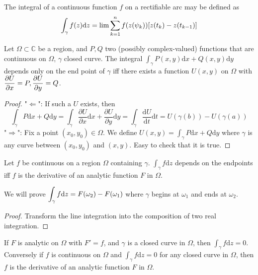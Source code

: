 The integral of a continuous function  $ f $ on a rectifiable arc may be defined as 
\[\displaystyle\int_\gamma f(z)\mathrm{d}z=\lim \sum_{k=1}^nf(z(\psi_k))[z(t_k)-z(t_{k-1})]\] 
\begin{theorem}\label{thm:5.1.2:integral conserved iff it is a derivative of an analytic function}
    Let  $ \Omega\subset \mathbb{C} $ be a region, and  $ P,Q $ two (possibly complex-valued) functions that are continuous on  $ \Omega $,  $ \gamma $ closed curve. The integral  $ \int_\gamma P(x,y)\mathrm{d}x+Q(x,y)\mathrm{d}y $ depends only on the end point of  $ \gamma $ iff there exists a function   $ U(x,y) $ on  $ \Omega $ with  $ \displaystyle\frac{\partial U}{\partial x}=P,\frac{\partial U}{\partial y}=Q $.  
\end{theorem}
\begin{proof}
    "$ \Leftarrow $": If such a  $ U $ exists, then 
    \[\int_\gamma P\mathrm{d}x+Q\mathrm{d}y=\int_\gamma\frac{\partial U}{\partial x}\mathrm{d}x+\frac{\partial U}{\partial y}\mathrm{d}y=\int_\gamma\frac{\mathrm{d}U}{\mathrm{d}t}\mathrm{d}t=U(\gamma(b))-U(\gamma(a))\] 
    "$ \Rightarrow $": Fix a point  $ (x_0,y_0)\in \Omega $. We define  $ U(x,y)=\int_\gamma P\mathrm{d}x+Q\mathrm{d}y$ where  $ \gamma $ is any curve between  $ (x_0,y_0) $ and  $ (x,y) $. Easy to check that it is true.     
\end{proof}
\begin{theorem}\label{Fundamental theorem of Calculus for integrals}
    Let  $ f $ be continuous on a region  $ \Omega $  containing  $ \gamma $.  $ \int_\gamma f\mathrm{d}z $ depends on the endpoints iff  $ f $ is the derivative of an analytic function  $ F $ in  $ \Omega $.     
\end{theorem}
\begin{remark}
    We will prove  $ \displaystyle\int_\gamma f\mathrm{d}z=F(\omega_2)-F(\omega_1) $ where  $ \gamma $ begins at  $ \omega_1 $ and ends at  $ \omega_2 $.    
\end{remark}
\begin{proof}
    Transform  the line integration into  the composition of two real integration.
\end{proof}
\begin{corollary}\label{Corollary of Fundamental Theorem}
    If  $ F $ is analytic on  $ \Omega $ with  $ F'=f $, and  $ \gamma $ is a closed curve in  $\Omega $, then  $ \int_\gamma f\mathrm{d}z=0 $. Conversely if  $ f $  is continuous on  $ \Omega $ and  $ \int_\gamma f\mathrm{d}z=0 $ for any closed curve in  $ \Omega $, then  $ f $ is the derivative of an analytic function  $ F $ in  $\Omega $.          
\end{corollary}

